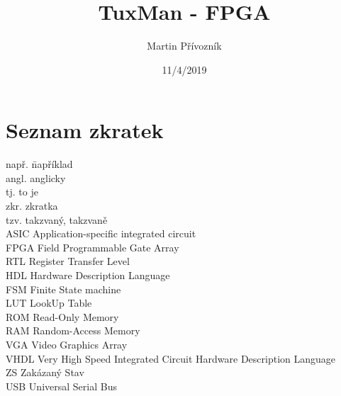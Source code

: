 \documentclass{report}
\title{TuxMan - FPGA}
\date{11/4/2019}
\author{Martin Přívozník}
\begin{document}
  
   
    
     
      
  \newpage

\newpage
\tableofcontents
\listoffigures
\listoftables
\clearpage
\chapter*{Seznam zkratek}
\begin{tabbing}
    např. \hspace{2em} \= například \\
    angl.  \>  anglicky \\
    tj.  \>  to je \\
    zkr.  \>  zkratka \\
    tzv. \> takzvaný, takzvaně \\
    ASIC  \>  Application-specific integrated circuit \\
    FPGA  \>  Field Programmable Gate Array \\
    RTL  \>  Register Transfer Level \\
   HDL \> Hardware Description Language \\
   FSM \> Finite State machine \\
   LUT \> LookUp Table \\
  ROM \> Read-Only Memory \\
 RAM \> Random-Access Memory \\
 VGA \> Video Graphics Array \\
 VHDL \> Very High Speed Integrated Circuit Hardware Description Language \\
 ZS \> Zakázaný Stav \\
 USB \> Universal Serial Bus \\
\end{tabbing}

\newpage
{}
\end{document}
